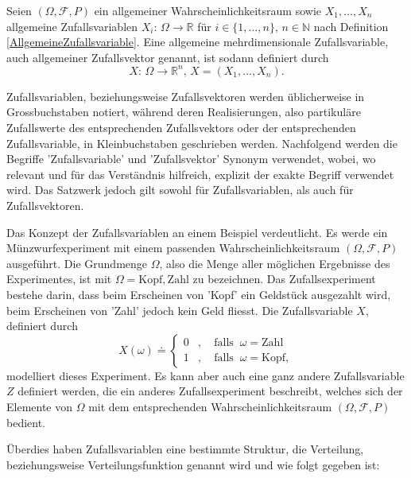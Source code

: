 \documentclass[a4paper,12pt]{article}
\begin{document}
\begin{dn}\label{AllgemeinmehrdimensionaleZufallsvariable}
	Seien $(\Omega,\mathcal{F},P)$ ein allgemeiner Wahrscheinlichkeitsraum sowie $X_1,\dots,X_n$ allgemeine Zufallsvariablen $X_i:\,\Omega \rightarrow \mathbb{R}$ für $i \in \{1,\dots,n\},\, n \in \mathbb{N}$ nach Definition \ref{AllgemeineZufallsvariable}. Eine allgemeine mehrdimensionale Zufallsvariable, auch allgemeiner Zufallsvektor genannt, ist sodann definiert durch \begin{equation}
		X:\, \Omega \rightarrow \mathbb{R}^n, \, X = (X_1,\dots,X_n).
	\end{equation}
\end{dn}

Zufallsvariablen, beziehungsweise Zufallsvektoren werden üblicherweise in Grossbuchstaben notiert, während deren Realisierungen, also partikuläre Zufallswerte des entsprechenden Zufallsvektors oder der entsprechenden Zufallsvariable, in Kleinbuchstaben geschrieben werden. Nachfolgend werden die Begriffe 'Zufallsvariable' und 'Zufallsvektor' Synonym verwendet, wobei, wo relevant und für das Verständnis hilfreich, explizit der exakte Begriff verwendet wird. Das Satzwerk jedoch gilt sowohl für Zufallsvariablen, als auch für Zufallsvektoren.

Das Konzept der Zufallsvariablen an einem Beispiel verdeutlicht. Es werde ein Münzwurfexperiment mit einem passenden Wahrscheinlichkeitsraum $(\Omega, \mathcal{F},P)$ ausgeführt. Die Grundmenge $\Omega$, also die Menge aller möglichen Ergebnisse des Experimentes, ist mit $\Omega = {\mathrm{Kopf}, \mathrm{Zahl}}$ zu bezeichnen. Das Zufallsexperiment bestehe darin, dass beim Erscheinen von 'Kopf' ein Geldstück ausgezahlt wird, beim Erscheinen von 'Zahl' jedoch kein Geld fliesst. Die Zufallsvariable $X$, definiert durch \begin{equation}
	X(\omega) \doteq \begin{cases}
		0&,\quad \mathrm{falls}\;\; \omega=\mathrm{Zahl} \\
		1&,\quad \mathrm{falls}\;\; \omega=\mathrm{Kopf,}
	\end{cases}
\end{equation} modelliert dieses Experiment. Es kann aber auch eine ganz andere Zufallsvariable $Z$ definiert werden, die ein anderes Zufallsexperiment beschreibt, welches sich der Elemente von $\Omega$ mit dem entsprechenden Wahrscheinlichkeitsraum $(\Omega, \mathcal{F},P)$ bedient.

Überdies haben Zufallsvariablen eine bestimmte Struktur, die Verteilung, beziehungsweise Verteilungsfunktion genannt wird und wie folgt gegeben ist:
\end{document}
